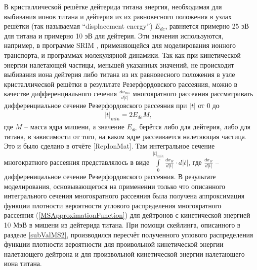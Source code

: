 \documentclass[a4paper,12pt]{article}
\begin{document}
\begin{large}
	
	В кристаллической решётке дейтерида титана энергия, необходимая для выбивания ионов титана и дейтерия из их равновесного положения в узлах решётки (так называемая ``displacement energy'') $E_{de}$, равняется примерно 25 эВ для титана и примерно 10 эВ для дейтерия.
  	Эти значения используются, например, в программе SRIM \cite{SRIM}, применяющейся для моделирования ионного транспорта, и программах молекулярной динамики.
  	Так как при кинетической энергии налетающей частицы, меньшей указанных значений, не происходит выбивания иона дейтерия либо титана из их равновесного положения в узле кристаллической решётки в результате Резерфордовского рассеяния, можно в качестве дифференциального сечения $\frac{d\sigma_{ms}}{d|t|}$ многократного рассеяния рассматривать дифференциальное сечение Резерфордовского рассеяния при $|t|$ от 0 до
\begin{equation}
\begin{aligned} 
 \label{Tmin}  
    |t|_{min}=2E_{de}M,
\end{aligned}
\end{equation}
	где $M$ -- масса ядра мишени, а значение $E_{de}$ берётся либо для дейтерия, либо для титана, в зависимости от того, на каком ядре рассеивается налетающая частица.
	Это и было сделано в отчёте [RepIonMat].
	Там интегральное сечение многократного рассеяния представлялось в виде $\int \limits_0^{|t|_{min}} \frac{d\sigma_R}{d|t|} \cdot d|t|$, где $\frac{d\sigma_R}{d|t|}$ -- дифференицальное сечение Резерфордовского рассеяния.
	В результате моделирования, основывающегося на применении только что описанного интегрального сечения многократного рассеяния была получена аппроксимация функции плотности вероятности углового распределения многократного рассеяния (\ref{MSApproximationFunction}) для дейтронов с кинетической энергией 10 МэВ в мишени из дейтерида титана.
	При помощи скейлинга, описанного в разделе \ref{subValMS2}, производился пересчёт полученного углового распределения функции плотности вероятности для проивольной кинетической энергии налетающего дейтрона и для произвольной кинетической энергии налетающего иона титана.
	

\end{large}
\end{document}
